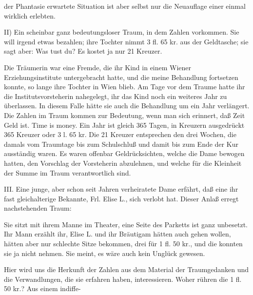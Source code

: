 \documentclass[twoside=true,titlepage=false,open=any, parskip=never, fontsize=10pt, headings=small, chapterprefix=false, appendixprefix=false]{scrbook}
\begin{document}
         
            
            
            
        \pstart
        der Phantasie erwartete Situation ist aber selbst nur die Neuauflage einer einmal wirklich erlebten.
        \pend
    
            
        \pstart
        II) Ein scheinbar ganz bedeutungsloser Traum, in dem
               Zahlen vorkommen. Sie will irgend etwas bezahlen; ihre
                  Tochter nimmt 3 fl. 65 kr. aus der Geldtasche; sie sagt aber: Was tust du? Es
                  kostet ja nur 21 Kreuzer.
        \pend
    
            
        \pstart
        Die Träumerin war eine Fremde, die ihr Kind in einem Wiener Erziehungsinstitute
               untergebracht hatte, und die meine Behandlung fortsetzen konnte, so lange ihre
               Tochter in Wien blieb. Am Tage vor dem Traume hatte ihr die Institutsvorsteherin nahegelegt, ihr das Kind noch ein weiteres Jahr zu
               überlassen. In diesem Falle hätte sie auch die Behandlung um ein Jahr
               verlängert. Die Zahlen im Traum kommen zur Bedeutung, wenn man sich
               erinnert, daß Zeit Geld ist. Time is money.
               Ein Jahr ist gleich 365 Tagen, in Kreuzern ausgedrückt 365 Kreuzer oder 3 l. 65 kr. Die 21 Kreuzer entsprechen den
               drei Wochen, die damals vom Traumtage bis zum
               Schulschluß und damit bis zum Ende der Kur ausständig waren. Es waren
               offenbar Geldrücksichten, welche die Dame bewogen hatten, den Vorschlag der
               Vorsteherin abzulehnen, und welche für die Kleinheit der Summe im
               Traum verantwortlich sind.
        \pend
    
            
        \pstart
        III. Eine junge, aber schon seit Jahren verheiratete Dame erfährt, daß eine ihr
               fast gleichalterige Bekannte, Frl. Elise L., sich verlobt hat. Dieser Anlaß
               erregt nachstehenden Traum:
        \pend
    
            
        \pstart
        Sie sitzt mit ihrem Manne im Theater, eine Seite des Parketts ist
                  ganz unbesetzt. Ihr Mann erzählt ihr, Elise L. und ihr Bräutigam hätten auch gehen
                  wollen, hätten aber nur schlechte Sitze bekommen, drei für 1 ﬂ. 50 kr., und die
                  konnten sie ja nicht nehmen. Sie meint, es wäre auch kein Unglück
               gewesen.
        \pend
    
            
        \pstart
        Hier wird uns die Herkunft der Zahlen aus dem Material der Traumgedanken und die
               Verwandlungen, die sie erfahren haben, interessieren. Woher rühren die 1 fl. 50 kr.? Aus einem indiffe-
        \pend
    
\end{document}
